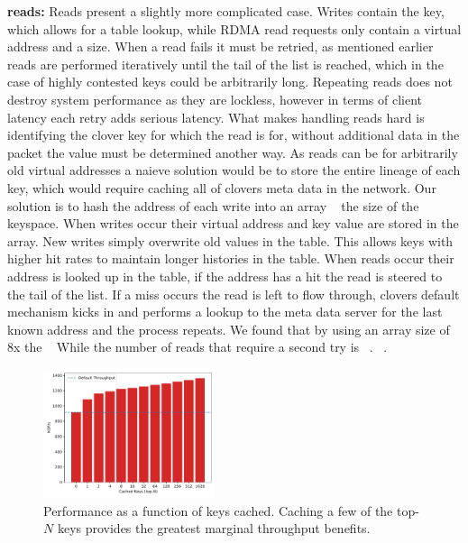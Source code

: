 \textbf{reads:} Reads present a slightly more complicated case. Writes contain
the key, which allows for a table lookup, while RDMA read requests only contain
a virtual address and a size. When a read fails it must be retried, as mentioned
earlier reads are performed iteratively until the tail of the list is reached,
which in the case of highly contested keys could be arbitrarily long. Repeating
reads does not destroy system performance as they are lockless, however in terms
of client latency each retry adds serious latency. What makes handling reads
hard is identifying the clover key for which the read is for, without additional
data in the packet the value must be determined another way. As reads can be for
arbitrarily old virtual addresses a naieve solution would be to store the entire
lineage of each key, which would require caching all of clovers meta data in the
network. Our solution is to hash the address of each write into an array
~ the size of the keyspace. When writes occur their virtual address and
key value are stored in the array. New writes simply overwrite old values in the
table. This allows keys with higher hit rates to maintain longer histories in
the table. When reads occur their address is looked up in the table, if the
address has a hit the read is steered to the tail of the list. If a miss occurs
the read is left to flow through, clovers default mechanism kicks in and
performs a lookup to the meta data server for the last known address and the
process repeats. We found that by using an array size of 8x the ~ While the number of reads that require a
second try is ~. ~.

\begin{figure}
    \includegraphics[width=0.45\textwidth]{fig/cache.pdf}
    \caption{Performance as a function of keys cached. Caching a few
    of the top-$N$ keys provides the greatest marginal throughput
    benefits.}
    \label{fig:cache}
\end{figure}

